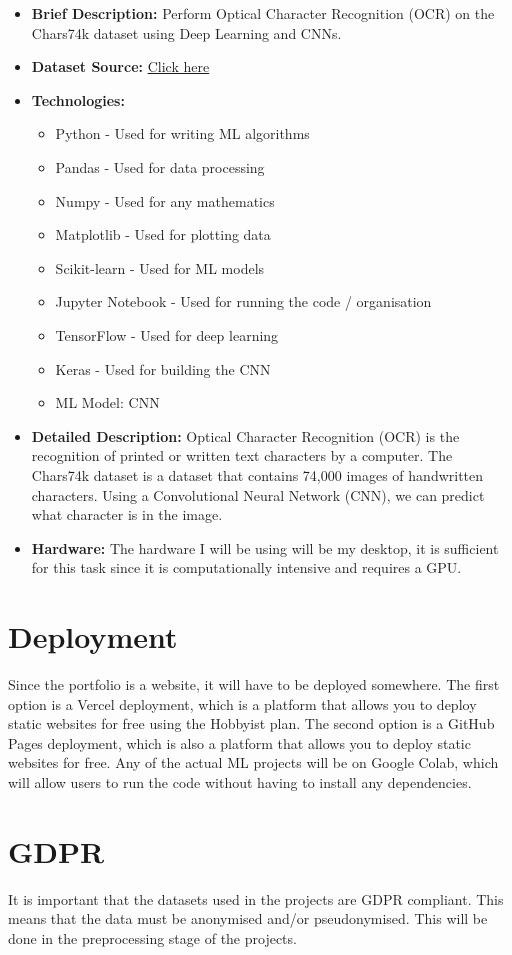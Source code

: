 \documentclass{article}
\begin{document}
\begin{itemize}
    \item \textbf{Brief Description:} Perform Optical Character Recognition (OCR) on the Chars74k dataset using Deep Learning and CNNs.
    \item \textbf{Dataset Source:} \href{https://web.stanford.edu/class/archive/cs/cs109/cs109.1166/problem12.html}{Click here}
    \item \textbf{Technologies:}
    \begin{itemize}
        \item Python - Used for writing ML algorithms
        \item Pandas - Used for data processing
        \item Numpy - Used for any mathematics
        \item Matplotlib - Used for plotting data
        \item Scikit-learn - Used for ML models
        \item Jupyter Notebook - Used for running the code / organisation
        \item TensorFlow - Used for deep learning
        \item Keras - Used for building the CNN
        \item ML Model: CNN
    \end{itemize}
    \item \textbf{Detailed Description:} Optical Character Recognition (OCR) is the recognition of printed or written text characters by a computer.
    The Chars74k dataset is a dataset that contains 74,000 images of handwritten characters. Using a Convolutional Neural Network (CNN), we can predict what character is in the image.
    \item \textbf{Hardware:} The hardware I will be using will be my desktop, it is sufficient for this task since it is computationally intensive and requires a GPU.
\end{itemize}

\section{Deployment}    
Since the portfolio is a website, it will have to be deployed somewhere. The first option is a Vercel deployment, 
which is a platform that allows you to deploy static websites for free using the Hobbyist plan. 
The second option is a GitHub Pages deployment, which is also a platform that allows you to deploy static websites for free. 
Any of the actual ML projects will be on Google Colab, which will allow users to run the code without having to install any dependencies.

\section{GDPR}
It is important that the datasets used in the projects are GDPR compliant. This means that the data must be anonymised and/or pseudonymised.
This will be done in the preprocessing stage of the projects.
\end{document}
